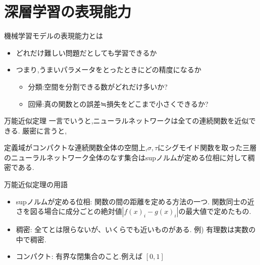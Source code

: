\section{深層学習の表現能力}

\begin{frame}[fragile]{機械学習モデルの表現能力とは}
\begin{itemize}
\item どれだけ難しい問題だとしても学習できるか
\item つまり,うまいパラメータをとったときにどの精度になるか
  \begin{itemize}
  \item 分類:空間を分割できる数がどれだけ多いか?
  \item 回帰:真の関数との誤差≒損失をどこまで小さくできるか?
  \end{itemize}
\end{itemize}
\end{frame}


\begin{frame}[fragile]{万能近似定理}
一言でいうと,ニューラルネットワークは全ての連続関数を近似できる.
厳密に言うと,
\begin{theorem}
定義域がコンパクトな連続関数全体の空間上,$\sigma,\tau$にシグモイド関数を取った三層のニューラルネットワーク全体のなす集合はsupノルムが定める位相に対して稠密である.
\end{theorem}
\end{frame}


\begin{frame}[fragile]{万能近似定理の用語}
\begin{itemize}
\item supノルムが定める位相: 関数の間の距離を定める方法の一つ.
  関数同士の近さを図る場合に成分ごとの絶対値$|f(x)_i-g(x)_i|$の最大値で定めたもの.
\item 稠密: 全てとは限らないが、いくらでも近いものがある.
  例) 有理数は実数の中で稠密.
\item コンパクト: 有界な閉集合のこと.例えば $[0, 1]$
\end{itemize}
\end{frame}


